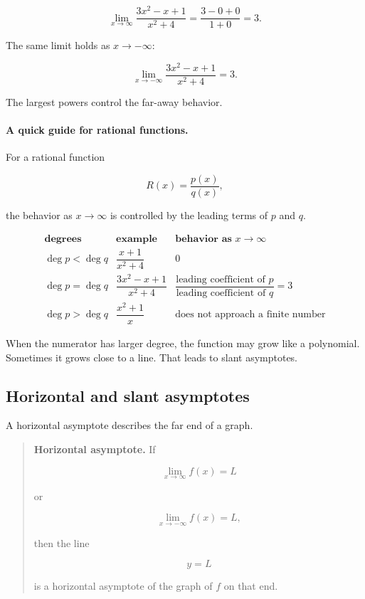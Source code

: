 \[
\lim_{x\to\infty}\frac{3x^2-x+1}{x^2+4}
=
\frac{3-0+0}{1+0}
=
3.
\]

The same limit holds as \(x\to-\infty\):

\[
\lim_{x\to-\infty}\frac{3x^2-x+1}{x^2+4}=3.
\]

The largest powers control the far-away behavior.

\paragraph{A quick guide for rational functions.}
For a rational function

\[
R(x)=\frac{p(x)}{q(x)},
\]

the behavior as \(x\to\infty\) is controlled by the leading terms of \(p\) and \(q\).

\[
\begin{array}{c|c|c}
\textbf{degrees} & \textbf{example} & \textbf{behavior as }x\to\infty \\ \hline
\deg p<\deg q
&
\dfrac{x+1}{x^2+4}
&
0 \\[10pt]
\deg p=\deg q
&
\dfrac{3x^2-x+1}{x^2+4}
&
\dfrac{\text{leading coefficient of }p}{\text{leading coefficient of }q}=3 \\[12pt]
\deg p>\deg q
&
\dfrac{x^2+1}{x}
&
\text{does not approach a finite number}
\end{array}
\]

When the numerator has larger degree, the function may grow like a polynomial.  Sometimes it grows close to a line.  That leads to slant asymptotes.

\subsection{Horizontal and slant asymptotes}
\label{subsec:horizontal-slant-asymptotes}

A horizontal asymptote describes the far end of a graph.

\begin{quote}
\textbf{Horizontal asymptote.}
If

\[
\lim_{x\to\infty}f(x)=L
\]

or

\[
\lim_{x\to-\infty}f(x)=L,
\]

then the line

\[
y=L
\]

is a horizontal asymptote of the graph of \(f\) on that end.
\end{quote}

